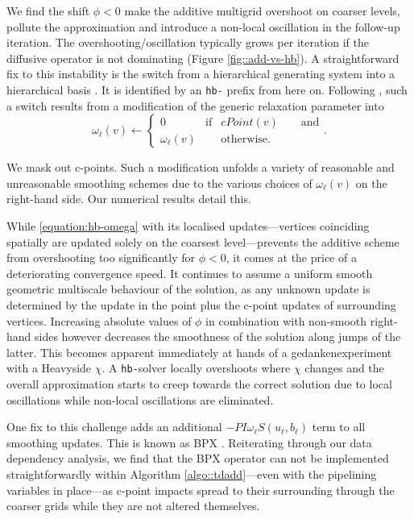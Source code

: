 We find the shift $\phi<0$ make the additive multigrid
overshoot on coarser levels, pollute the approximation and introduce a non-local
oscillation in the follow-up iteration.
The overshooting/oscillation typically grows per iteration if the diffusive
operator is not dominating (Figure \ref{fig::add-vs-hb}).
A straightforward fix to this instability is the switch from a
hierarchical generating system into a hierarchical basis
\cite{Griebel:90:HTMM,Griebel:94:Multilevel}.
It is identified by an \texttt{hb-}
prefix from here on.
Following \cite{Bastian:98:AdditiveVsMultiplicativeMG}, such a switch results
from a modification of the generic relaxation parameter into
\begin{equation}
  \omega_\ell (v) \gets \left\{ 
    \begin{array}{rcl}
      0 & \mbox{if} & cPoint(v) \qquad \mbox{and} \\
      \omega_\ell (v) & & \mbox{otherwise.} 
    \end{array}
  \right..
  \label{equation:hb-omega}
\end{equation}

\noindent
We mask out c-points.
Such a modification unfolds a variety of reasonable
and unreasonable smoothing schemes due to the various choices of
$\omega_\ell(v)$ on the right-hand side.
Our numerical results detail this.


While \eqref{equation:hb-omega} with its localised updates---vertices coinciding spatially are updated solely on the
coarsest level---prevents the additive scheme from overshooting too
significantly for $\phi<0$, it comes at the price of a deteriorating convergence
speed. 
It continues to assume a uniform smooth geometric multiscale behaviour of the solution, as 
any unknown update is determined by the update in the point plus the c-point
updates of surrounding vertices.
Increasing absolute values of $\phi$ in combination with non-smooth right-hand
sides however decreases the smoothness of the solution along jumps of
the latter.
This becomes apparent immediately at hands of a gedankenexperiment with a Heavyside $\chi$.
A \texttt{hb-}solver locally overshoots where $\chi$ changes and the overall
approximation starts to creep towards the correct solution due
to local oscillations while non-local oscillations are eliminated.

One fix to this challenge adds an additional $-PI\omega _\ell
S(u_\ell, b_\ell)$ term to all smoothing updates.
This is known as BPX
\cite{Bastian:98:AdditiveVsMultiplicativeMG,Bramble:90:BPX}.
Reiterating through our data dependency analysis, we find that the BPX operator
can not be implemented straightforwardly within Algorithm
\ref{algo::tdadd}---even with the pipelining variables in place---as 
c-point impacts spread to their surrounding through the coarser grids while they
are not altered themselves.

